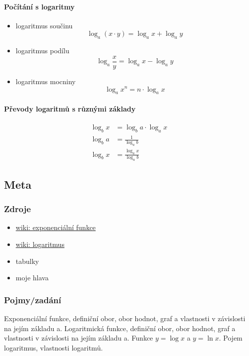 \documentclass[12pt]{article}
\begin{document}
\paragraph{Počítání s logaritmy}
\begin{itemize}
\item logaritmus součinu
\begin{equation}
\log_a \left( x \cdot y\right) = \log_a x + \log_a y
\end{equation}
\item logaritmus podílu
\begin{equation}
\log_a{\frac{x}{y}} = \log_a{x} - \log_a{y}
\end{equation}
\item logaritmus mocniny
\begin{equation}
\log_a{x^n} = n \cdot \log_a{x}
\end{equation}
\end{itemize}
\paragraph{Převody logaritmů s různými základy}
\begin{align}
\log_b x &= \log_b{a} \cdot\log_a{x}\\
\log_b{a} &= \frac{1}{\log_a{b}}\\
\log_b{x} &= \frac{\log_a{x}}{\log_a{b}}
\end{align}
\subsection{Meta}
\subsubsection{Zdroje}
\begin{itemize}
\item \href{https://cs.wikipedia.org/wiki/Exponenci\%C3\%A1ln\%C3\%AD_funkce}{wiki: exponenciální funkce}
\item \href{https://cs.wikipedia.org/wiki/Logaritmus}{wiki: logaritmus}
\item tabulky
\item moje hlava
\end{itemize}
\subsubsection{Pojmy/zadání}
Exponenciální funkce, definiční obor, obor hodnot, graf a vlastnosti v závislosti na jejím základu a. Logaritmická funkce, definiční obor, obor hodnot, graf a vlastnosti v závislosti na jejím základu a. Funkce $y = \log x$	 a $y =\ln x$. Pojem logaritmus, vlastnosti logaritmů.
\end{document}
